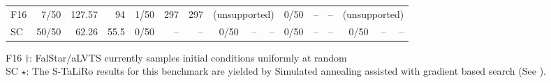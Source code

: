 \begin{table}
{\begin{tabular}{lrrrrrrrrrrrrrrr}
			F16 &7/50&127.57&94 & 1/50 & 297 & 297 & \multicolumn{3}{c}{(unsupported)} & 0/50\rlap{$\dagger$} & -- & -- & \multicolumn{3}{c}{(unsupported)}\\
			\cmidrule(r){1-1} \cmidrule(lr){2-4} \cmidrule(lr){5-7} \cmidrule(lr){8-10} \cmidrule(lr){11-13} \cmidrule(lr){14-16}
			SC  &50/50  \rlap{$\star$} & 62.26 & 55.5 & 0/50 & -- & -- & 0/50 & -- & -- & 0/50 & -- & -- & 0/50 & -- &--\\
			\bottomrule
	\end{tabular}}
	\begin{flushleft}
		\small F16 $\dagger$: FalStar/aLVTS currently samples initial conditions uniformly at random\\
		\small SC $\star$: The S-TaLiRo results for this benchmark are yielded by Simulated annealing assisted with gradient based search (See \cite{YaghoubiHSCC}).   
	\end{flushleft}
\end{table}


